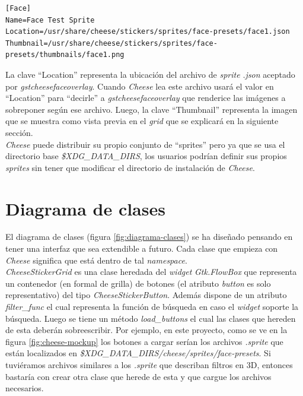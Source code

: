 \documentclass[a4paper,openright,12pt]{report}
\begin{document}
\begin{verbatim}
[Face]
Name=Face Test Sprite
Location=/usr/share/cheese/stickers/sprites/face-presets/face1.json
Thumbnail=/usr/share/cheese/stickers/sprites/face-presets/thumbnails/face1.png
\end{verbatim}

La clave ``Location'' representa la ubicación del archivo de \textit{sprite}
\textit{.json} aceptado por \textit{gstcheesefaceoverlay}. Cuando
\textit{Cheese} lea este archivo usará el valor en ``Location'' para ``decirle''
a \textit{gstcheesefaceoverlay} que renderice las imágenes a sobreponer según
ese archivo. Luego, la clave ``Thumbnail'' representa la imagen que se muestra
como vista previa en el \textit{grid} que se explicará en la siguiente sección.\\

\textit{Cheese} puede distribuir su propio conjunto de ``sprites'' pero ya que
se usa el directorio base \textit{\$XDG\_DATA\_DIRS}, los usuarios podrían
definir sus propios \textit{sprites} sin tener que modificar el directorio de
instalación de \textit{Cheese}.

\section{Diagrama de clases}
El diagrama de clases (figura \ref{fig:diagrama-clases}) se ha diseñado pensando
en tener una interfaz que sea extendible a futuro. Cada clase que empieza con
\textit{Cheese} significa que está dentro de tal \textit{namespace}.\\

\textit{CheeseStickerGrid} es una clase heredada del \textit{widget}
\textit{Gtk.FlowBox} que representa un contenedor (en formal de grilla) de
botones (el atributo \textit{button} es solo representativo) del tipo
\textit{CheeseStickerButton}. Además dispone de un atributo
\textit{filter\_func} el cual representa la función de búsqueda en caso el
\textit{widget} soporte la búsqueda. Luego se tiene un método
\textit{load\_buttons} el cual las clases que hereden de esta deberán
sobreescribir. Por ejemplo, en este proyecto, como se ve en la figura
\ref{fig:cheese-mockup} los botones a cargar serían los archivos
\textit{.sprite} que están localizados en
\textit{\$XDG\_DATA\_DIRS/cheese/sprites/face-presets}. Si tuviéramos archivos
similares a los \textit{.sprite} que describan filtros en 3D, entonces bastaría
con crear otra clase que herede de esta y que cargue los archivos necesarios.\\
\end{document}
